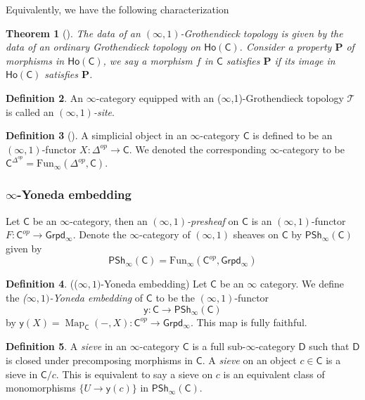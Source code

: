 \documentclass[12pt]{amsart}
\newtheorem{thm}{Theorem}[section]
\theoremstyle{definition}
\newtheorem{defn}[thm]{Definition}
\theoremstyle{remark}
\numberwithin{equation}{section}
\newcommand{\CC}{{\mathsf C}}
\newcommand{\1}{{\mathbb{1}}}
\newcommand{\y}{\mathsf{y}}
\newcommand{\ho}{\mathsf{Ho}}
\newcommand{\igpd}{\mathsf{Grpd_{\infty}}}
\newcommand{\pshi}{\mathsf{PSh_{\infty}}}
\newcommand{\map}{\operatorname{Map}}
\newcommand{\funi}{\operatorname{Fun_{\infty}}}
\begin{document}
Equivalently, we have the following characterization
\begin{thm}[\cite{Lur09a}]
     The data of an $(\infty, 1)$-Grothendieck topology is given by the data of an ordinary Grothendieck topology on $\ho(\CC)$. Consider a property $\mathbf{P}$ of morphisms in $\ho(\CC)$, we say a morphism $f$ in $\CC$ satisfies $\mathbf{P}$ if its image in $\ho(\CC)$ satisfies $\mathbf{P}$.
\end{thm}

\begin{defn}
	An $\infty$-category equipped with an ($\infty$,1)-Grothendieck topology $\mathcal{T}$ is called an {\it $(\infty,1)$-site}.
\end{defn}

\begin{defn}[\cite{Lur09a}] %
	A simplicial object in an $\infty$-category $\mathsf{C}$ is defined to be an $(\infty,1)$-functor $X:\Delta^{op}\to \mathsf{C}$. We denoted the corresponding $\infty$-category to be $\mathsf{C}^{\Delta^{op}}=\funi(\Delta^{op}, \mathsf{C})$.
\end{defn}
\subsubsection{$\infty$-Yoneda embedding}
Let $\mathsf{C}$ be an $\infty$-category, then an {\it $(\infty,1)$-presheaf} on $\mathsf{C}$ is an $(\infty, 1)$-functor $F: \mathsf{C}^{op} \to \igpd$. Denote the $\infty$-category of $(\infty,1)$ sheaves on $\mathsf{C}$ by
$\pshi(\mathsf{C})$ given by
\begin{equation*}
\pshi(\mathsf{C})= \funi(\mathsf{C}^{op}, \igpd )
\end{equation*} 

\begin{defn}(($\infty,1)$-Yoneda embedding)
	Let $\mathsf{C}$ be an $\infty$ category. We define the {\it ($\infty,1)$-Yoneda embedding} of $\mathsf{C}$ to be the $(\infty,1)$-functor $$\y: \mathsf{C} \to \pshi(\mathsf{C})$$
	by $\y(X)=\map_{\mathsf{C}}(-,X): \mathsf{C}^{op} \to \igpd$. This map is fully faithful. 
\end{defn}

\begin{defn}
	A {\it sieve} in an $\infty$-category $\mathsf{C}$ is a full sub-$\infty$-category $\mathsf{D}$ such that $\mathsf{D}$ is closed under precomposing morphisms in $\mathsf{C}$. A {\it sieve} on an object $c\in \mathsf{C}$ is a sieve in $\mathsf{C}/c$. This is equivalent to say a sieve on $c$ is an equivalent class of monomorphisms $\{U\to \y(c) \}$ in $\pshi(\mathsf{C})$.
\end{defn}
\end{document}
